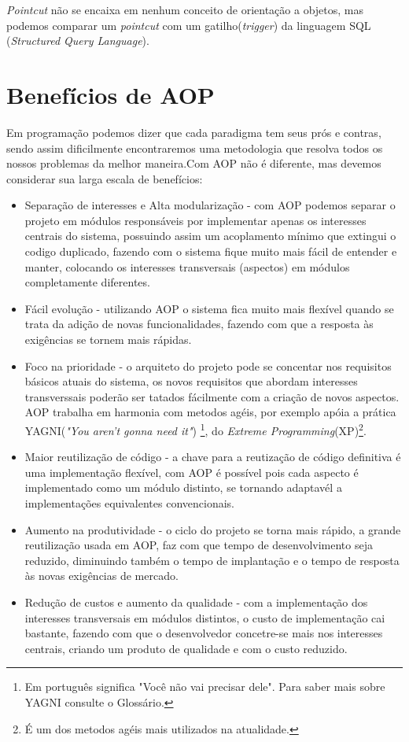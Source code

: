 \documentclass[tc,openright]{iiufrgs}
\begin{document}
\textit{Pointcut} não se encaixa em nenhum conceito de orientação a objetos, mas podemos comparar um \textit{pointcut} com um gatilho(\textit{trigger}) da linguagem SQL (\textit{Structured Query Language}).

\section{Benefícios de AOP}

Em programação podemos dizer que cada paradigma tem seus prós e contras, sendo assim dificilmente encontraremos uma metodologia que resolva todos os nossos problemas da melhor maneira.Com AOP não é diferente, mas devemos considerar sua larga escala de benefícios:

\begin{itemize}
\item Separação de interesses e Alta modularização - com AOP podemos separar o projeto em módulos responsáveis por implementar apenas os interesses centrais do sistema, possuindo assim um acoplamento mínimo que extingui o codigo duplicado, fazendo com o sistema fique muito mais fácil de entender e manter, colocando os interesses transversais (aspectos) em módulos completamente diferentes.\cite{laddad2003aspectj} 
\item Fácil evolução - utilizando AOP o sistema fica muito mais flexível quando se trata da adição de novas funcionalidades, fazendo com que a resposta às exigências se tornem mais rápidas.
\item Foco na prioridade - o arquiteto do projeto pode se concentar nos requisitos básicos atuais do sistema, os novos requisitos que abordam interesses transverssais poderão ser tatados fácilmente com a criação de novos aspectos. AOP trabalha em harmonia com metodos agéis, por exemplo apóia a prática YAGNI(\textit{"You aren’t gonna need it"}) \footnote{Em português significa "Você não vai precisar dele". Para saber mais sobre YAGNI consulte o Glossário.}, do \textit{Extreme Programming}(XP)\footnote{É um dos metodos agéis mais utilizados na atualidade.}.\cite{laddad2003aspectj} 
\item Maior reutilização de código - a chave para a reutização de código definitiva é uma implementação flexível, com AOP é possível pois cada aspecto é implementado como um módulo distinto, se tornando adaptavél a implementações equivalentes convencionais.\cite{laddad2003aspectj} 
\item Aumento na produtividade - o ciclo do projeto se torna mais rápido, a grande reutilização usada em AOP, faz com que tempo de desenvolvimento seja reduzido, diminuindo também o tempo de implantação e o tempo de resposta às novas exigências de mercado. \cite{laddad2003aspectj} 
\item Redução de custos e aumento da qualidade - com a implementação dos interesses transversais em módulos distintos, o custo de implementação cai bastante, fazendo com que o desenvolvedor concetre-se mais nos interesses centrais, criando um produto de qualidade e com o custo reduzido.
\end{itemize}
\end{document}
